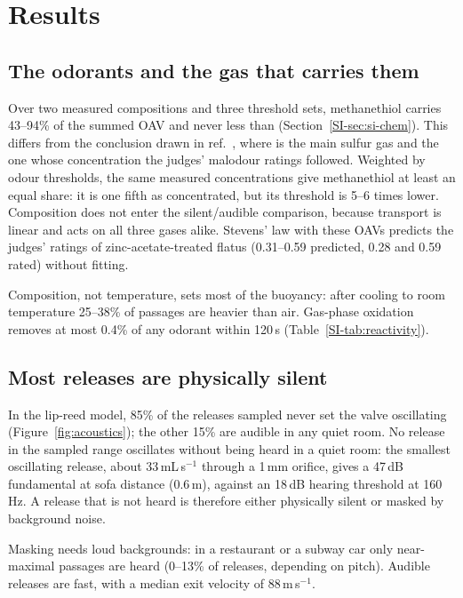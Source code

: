 \section{Results}
\label{sec:results}

\subsection{The odorants and the gas that carries them}
\label{sec:res-composition}
Over two measured compositions and three threshold sets, methanethiol carries 43--94\% of the summed OAV and never
less than  (Section~\ref{SI-sec:si-chem}). This differs from the conclusion drawn in
ref.~, where  is the main sulfur gas and the one whose concentration the judges' malodour
ratings followed. Weighted by odour thresholds, the same measured concentrations give methanethiol at least an equal
share: it is one fifth as concentrated, but its threshold is 5--6 times lower. Composition does not enter the
silent/audible comparison, because transport is linear and acts on all three gases alike. Stevens' law with these
OAVs predicts the judges' ratings of zinc-acetate-treated flatus (0.31--0.59 predicted, 0.28 and 0.59 rated) without
fitting.

Composition, not temperature, sets most of the buoyancy: after cooling to room temperature 25--38\% of passages are
heavier than air. Gas-phase oxidation removes at most 0.4\% of any odorant within 120\,s
(Table~\ref{SI-tab:reactivity}).

\subsection{Most releases are physically silent}
\label{sec:res-acoustics}
In the lip-reed model, 85\% of the releases sampled never set the valve oscillating (Figure~\ref{fig:acoustics}); the
other 15\% are audible in any quiet room. No release in the sampled range oscillates without being heard in a quiet
room: the smallest oscillating release, about 33\,mL\,s$^{-1}$ through a 1\,mm orifice, gives a 47\,dB fundamental at
sofa distance (0.6\,m), against an 18\,dB hearing threshold at 160\,Hz. A release that is not heard is therefore either physically silent or masked by
background noise.

Masking needs loud backgrounds: in a restaurant or a subway car only near-maximal passages are heard (0--13\% of
releases, depending on pitch). Audible releases are fast, with a median exit velocity of 88\,m\,s$^{-1}$.


